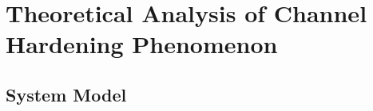 \resetdatestamp


\chapter{Theoretical Analysis of Channel Hardening Phenomenon}
\section{System Model}